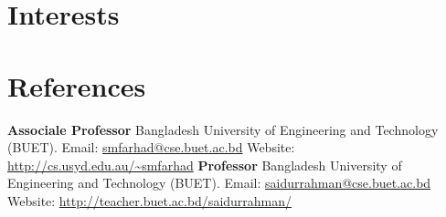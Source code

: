 \documentclass[11pt,a4paper,sans]{moderncv}
\begin{document}
\section{Interests}

\renewcommand{\listitemsymbol}{-~} %

\section{References}
{
\textbf{Associale Professor\newline}
Bangladesh University of Engineering and Technology (BUET).\newline
Email: \url{smfarhad@cse.buet.ac.bd} \newline
Website: \url{http://cs.usyd.edu.au/~smfarhad}
}
{
\textbf{Professor\newline}
Bangladesh University of Engineering and Technology (BUET).\newline
Email: \url{saidurrahman@cse.buet.ac.bd} \newline
Website: \url{http://teacher.buet.ac.bd/saidurrahman/}
}
\end{document}

